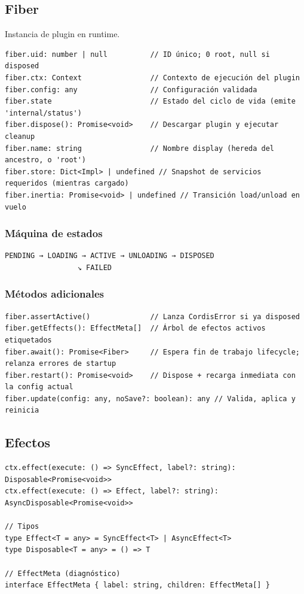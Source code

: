 \documentclass[11pt,a4paper]{article}
\begin{document}
\subsection*{Fiber}


Instancia de plugin en runtime.


\begin{lstlisting}
fiber.uid: number | null          // ID único; 0 root, null si disposed
fiber.ctx: Context                // Contexto de ejecución del plugin
fiber.config: any                 // Configuración validada
fiber.state                       // Estado del ciclo de vida (emite 'internal/status')
fiber.dispose(): Promise<void>    // Descargar plugin y ejecutar cleanup
fiber.name: string                // Nombre display (hereda del ancestro, o 'root')
fiber.store: Dict<Impl> | undefined // Snapshot de servicios requeridos (mientras cargado)
fiber.inertia: Promise<void> | undefined // Transición load/unload en vuelo
\end{lstlisting}


\subsubsection*{Máquina de estados}


\begin{lstlisting}
PENDING → LOADING → ACTIVE → UNLOADING → DISPOSED
                 ↘ FAILED
\end{lstlisting}


\subsubsection*{Métodos adicionales}


\begin{lstlisting}
fiber.assertActive()              // Lanza CordisError si ya disposed
fiber.getEffects(): EffectMeta[]  // Árbol de efectos activos etiquetados
fiber.await(): Promise<Fiber>     // Espera fin de trabajo lifecycle; relanza errores de startup
fiber.restart(): Promise<void>    // Dispose + recarga inmediata con la config actual
fiber.update(config: any, noSave?: boolean): any // Valida, aplica y reinicia
\end{lstlisting}


\subsection*{Efectos}


\begin{lstlisting}
ctx.effect(execute: () => SyncEffect, label?: string): Disposable<Promise<void>>
ctx.effect(execute: () => Effect, label?: string): AsyncDisposable<Promise<void>>

// Tipos
type Effect<T = any> = SyncEffect<T> | AsyncEffect<T>
type Disposable<T = any> = () => T

// EffectMeta (diagnóstico)
interface EffectMeta { label: string, children: EffectMeta[] }
\end{lstlisting}
\end{document}

